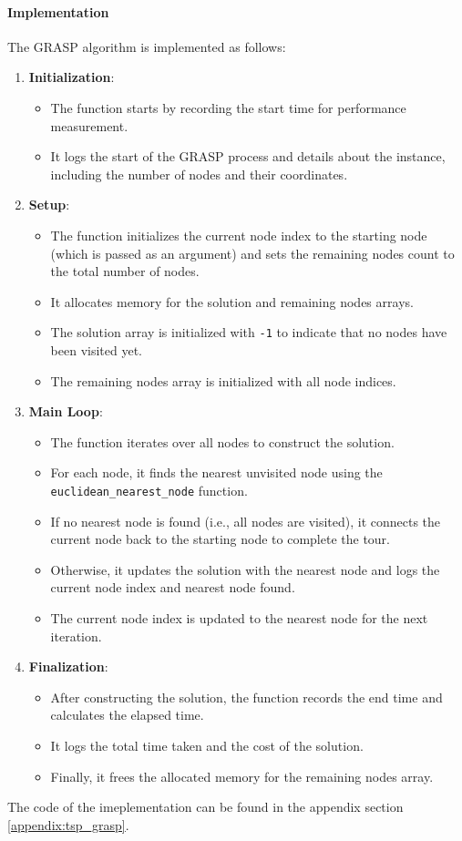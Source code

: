 \documentclass{article}
\begin{document}
\paragraph{Implementation}
The GRASP algorithm is implemented as follows:
\begin{enumerate} \item \textbf{Initialization}:
	      \begin{itemize} \item The function starts by recording the start time for performance measurement.
		      \item It logs the start of the GRASP process and details about the instance, including the number of nodes and their coordinates. \end{itemize}
	\item \textbf{Setup}:
	      \begin{itemize}
		      \item The function initializes the current node index to the starting node (which is passed as an argument) and sets the remaining nodes count to the total number of nodes.
		      \item It allocates memory for the solution and remaining nodes arrays.
		      \item The solution array is initialized with \texttt{-1} to indicate that no nodes have been visited yet.
		      \item The remaining nodes array is initialized with all node indices.
	      \end{itemize}

	\item \textbf{Main Loop}:
	      \begin{itemize}
		      \item The function iterates over all nodes to construct the solution.
		      \item For each node, it finds the nearest unvisited node using the \texttt{euclidean\_nearest\_node} function.
		      \item If no nearest node is found (i.e., all nodes are visited), it connects the current node back to the starting node to complete the tour.
		      \item Otherwise, it updates the solution with the nearest node and logs the current node index and nearest node found.
		      \item The current node index is updated to the nearest node for the next iteration.
	      \end{itemize}

	\item \textbf{Finalization}:
	      \begin{itemize}
		      \item After constructing the solution, the function records the end time and calculates the elapsed time.
		      \item It logs the total time taken and the cost of the solution.
		      \item Finally, it frees the allocated memory for the remaining nodes array.
	      \end{itemize}
\end{enumerate}
The code of the imeplementation can be found in the appendix section \ref{appendix:tsp_grasp}.
\end{document}
